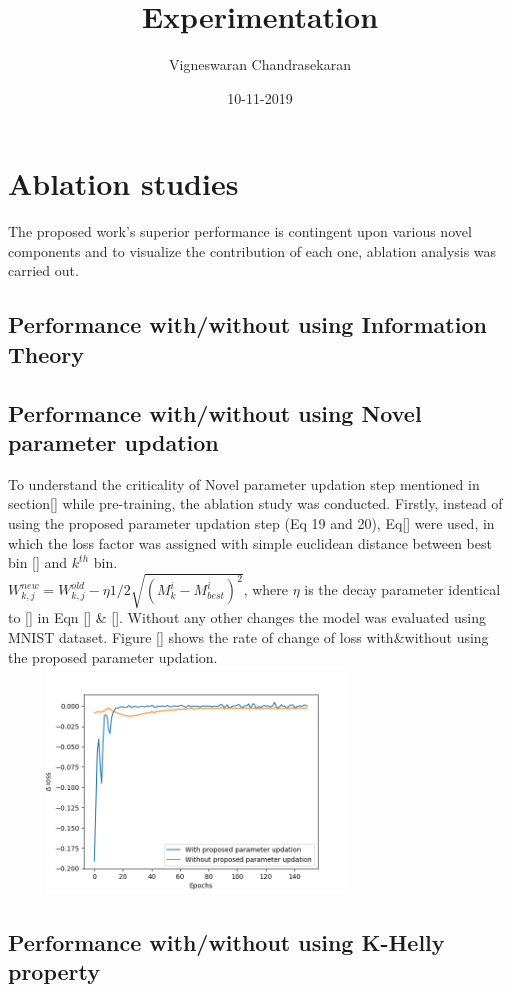 \documentclass{article}
\title{Experimentation}
\author{Vigneswaran Chandrasekaran}
\date{10-11-2019}
\begin{document}
\section{Ablation studies}
The proposed work's superior performance is contingent upon various novel components and to visualize the contribution of each one, ablation analysis was carried out.
\subsection{Performance with/without using Information Theory}

\subsection{Performance with/without using Novel parameter updation}
To understand the criticality of Novel parameter updation step mentioned in section[] while pre-training, the ablation study was conducted. Firstly, instead of using the proposed parameter updation step (Eq 19 and 20), Eq[] were used, in which the loss factor was assigned with simple euclidean distance between best bin [] and $k^{th}$ bin. 
\\
$ W_{k,j}^{new} = W_{k,j}^{old} - \eta1/2\sqrt{(M^{i}_{k} - M^{i}_{best})^2}$, where $\eta$ is the decay parameter identical to [] in Eqn [] \& []. Without any other changes the model was evaluated using MNIST dataset. 
Figure [] shows the rate of change of loss with\&without using the proposed parameter updation. 
\\
\includegraphics[width=10cm, height = 6cm]{param_upd_ab.png}
\subsection{Performance with/without using K-Helly property}
\end{document}
